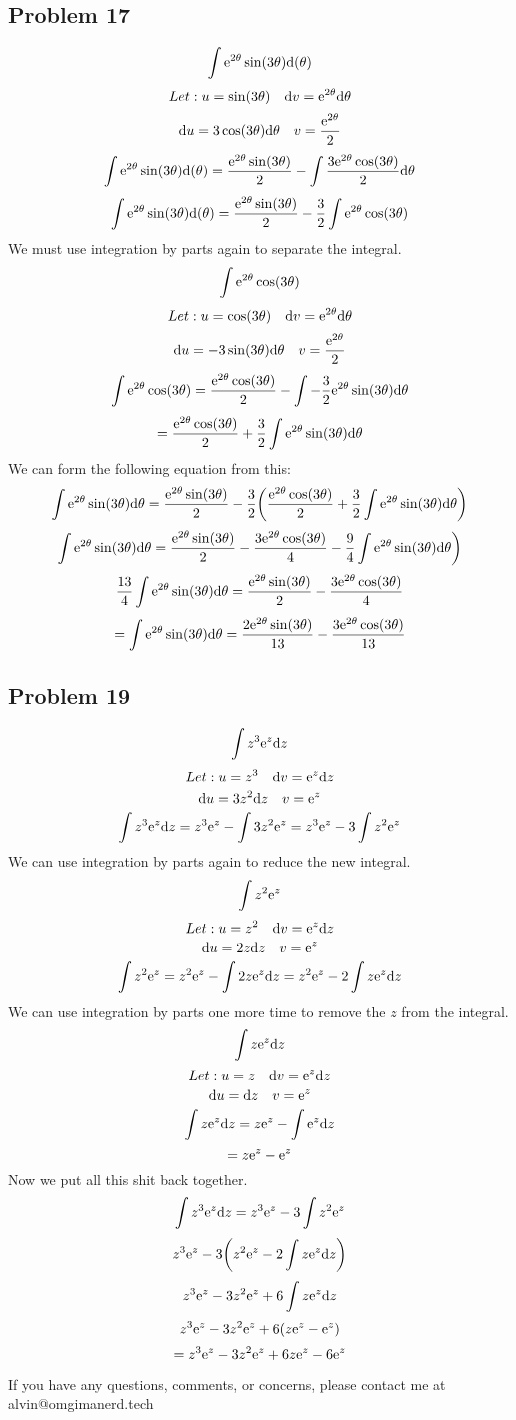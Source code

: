 \documentclass[letterpaper, 12pt]{math}
\begin{document}
\subsection*{Problem 17}
\[ \int{\mathrm{e}^{2\theta}\sin(3\theta)}\mathrm{d}(\theta) \]
\[ Let: u = \sin(3\theta) \quad \mathrm{d}{v} = \mathrm{e}^{2\theta}\mathrm{d}{\theta} \]
\[ \mathrm{d}{u} = 3\cos(3\theta)\mathrm{d}{\theta} \quad v = \frac{\mathrm{e}^{2\theta}}{2} \]
\[ \int{\mathrm{e}^{2\theta}\sin(3\theta)}\mathrm{d}(\theta) =
   \frac{\mathrm{e}^{2\theta}\sin(3\theta)}{2}-
   \int{\frac{3\mathrm{e}^{2\theta}\cos(3\theta)}{2}\mathrm{d}{\theta}} \]
\[ \int{\mathrm{e}^{2\theta}\sin(3\theta)}\mathrm{d}(\theta) =
   \frac{\mathrm{e}^{2\theta}\sin(3\theta)}{2}-
   \frac{3}{2}\int{\mathrm{e}^{2\theta}\cos(3\theta)} \]
We must use integration by parts again to separate the integral.
\[ \int{\mathrm{e}^{2\theta}\cos(3\theta)} \]
\[ Let: u = \cos(3\theta) \quad \mathrm{d}{v} = \mathrm{e}^{2\theta}\mathrm{d}{\theta} \]
\[ \mathrm{d}{u} = -3\sin(3\theta)\mathrm{d}{\theta} \quad v = \frac{\mathrm{e}^{2\theta}}{2} \]
\[ \int{\mathrm{e}^{2\theta}\cos(3\theta)} =
   \frac{\mathrm{e}^{2\theta}\cos(3\theta)}{2}-
   \int{-\frac{3}{2}\mathrm{e}^{2\theta}\sin(3\theta)\mathrm{d}{\theta}} \]
\[ = \frac{\mathrm{e}^{2\theta}\cos(3\theta)}{2}+\frac{3}{2}
   \int{\mathrm{e}^{2\theta}\sin(3\theta)\mathrm{d}{\theta}} \]
We can form the following equation from this:
\[ \int{\mathrm{e}^{2\theta}\sin(3\theta)\mathrm{d}{\theta}} =
   \frac{\mathrm{e}^{2\theta}\sin(3\theta)}{2}-
   \frac{3}{2}\bigg(\frac{\mathrm{e}^{2\theta}\cos(3\theta)}{2}+
   \frac{3}{2}\int{\mathrm{e}^{2\theta}\sin(3\theta)\mathrm{d}{\theta}}\bigg) \]
\[ \int{\mathrm{e}^{2\theta}\sin(3\theta)\mathrm{d}{\theta}} =
   \frac{\mathrm{e}^{2\theta}\sin(3\theta)}{2}-
   \frac{3\mathrm{e}^{2\theta}\cos(3\theta)}{4}-
   \frac{9}{4}\int{\mathrm{e}^{2\theta}\sin(3\theta)\mathrm{d}{\theta}}\bigg) \]
\[ \frac{13}{4}\int{\mathrm{e}^{2\theta}\sin(3\theta)\mathrm{d}{\theta}} =
   \frac{\mathrm{e}^{2\theta}\sin(3\theta)}{2}-
   \frac{3\mathrm{e}^{2\theta}\cos(3\theta)}{4} \]
\[ = \int{\mathrm{e}^{2\theta}\sin(3\theta)\mathrm{d}{\theta}} =
\frac{2\mathrm{e}^{2\theta}\sin(3\theta)}{13}-
\frac{3\mathrm{e}^{2\theta}\cos(3\theta)}{13} \]

\subsection*{Problem 19}
\[ \int{z^{3}\mathrm{e}^{z}\mathrm{d}{z}} \]
\[ Let: u = z^{3} \quad \mathrm{d}{v} = \mathrm{e}^{z}\mathrm{d}{z} \]
\[ \mathrm{d}{u} = 3z^{2}\mathrm{d}{z} \quad v = \mathrm{e}^{z} \]
\[ \int{z^{3}\mathrm{e}^{z}\mathrm{d}{z}} =
   z^{3}\mathrm{e}^{z}-\int{3z^{2}\mathrm{e}^{z}} =
   z^{3}\mathrm{e}^{z}-3\int{z^{2}\mathrm{e}^{z}} \]
We can use integration by parts again to reduce the new integral.
\[ \int{z^{2}\mathrm{e}^{z}} \]
\[ Let: u = z^{2} \quad \mathrm{d}{v} = \mathrm{e}^{z}\mathrm{d}{z} \]
\[ \mathrm{d}{u} = 2z\mathrm{d}{z} \quad v = \mathrm{e}^{z} \]
\[ \int{z^{2}\mathrm{e}^{z}} = z^{2}\mathrm{e}^{z}-\int{2z\mathrm{e}^{z}\mathrm{d}{z}} =
   z^{2}\mathrm{e}^{z}-2\int{z\mathrm{e}^{z}\mathrm{d}{z}} \]
We can use integration by parts one more time to remove the \( z \) from the
integral.
\[ \int{z\mathrm{e}^{z}\mathrm{d}{z}} \]
\[ Let: u = z \quad \mathrm{d}{v} = \mathrm{e}^{z}\mathrm{d}{z} \]
\[ \mathrm{d}{u} = \mathrm{d}{z} \quad v = \mathrm{e}^{z} \]
\[ \int{z\mathrm{e}^{z}\mathrm{d}{z}} = z\mathrm{e}^{z}-\int{\mathrm{e}^{z}\mathrm{d}{z}} \]
\[ = z\mathrm{e}^{z}-\mathrm{e}^{z} \]
Now we put all this shit back together.
\[ \int{z^{3}\mathrm{e}^{z}\mathrm{d}{z}} =
   z^{3}\mathrm{e}^{z}-3\int{z^{2}\mathrm{e}^{z}} \]
\[ z^{3}\mathrm{e}^{z}-3\bigg(z^{2}\mathrm{e}^{z}-2\int{z\mathrm{e}^{z}\mathrm{d}{z}}\bigg) \]
\[ z^{3}\mathrm{e}^{z}-3z^{2}\mathrm{e}^{z}+6\int{z\mathrm{e}^{z}\mathrm{d}{z}} \]
\[ z^{3}\mathrm{e}^{z}-3z^{2}\mathrm{e}^{z}+6(z\mathrm{e}^{z}-\mathrm{e}^{z}) \]
\[ = z^{3}\mathrm{e}^{z}-3z^{2}\mathrm{e}^{z}+6z\mathrm{e}^{z}-6\mathrm{e}^{z} \]

\begin{center}
  If you have any questions, comments, or concerns, please contact me at
  alvin@omgimanerd.tech
\end{center}
\end{document}
